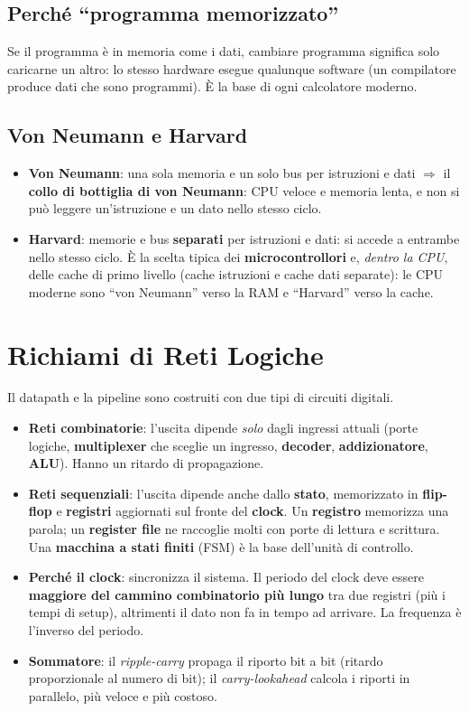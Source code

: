 \subsection{Perché ``programma memorizzato''}
Se il programma è in memoria come i dati, cambiare programma significa solo caricarne un altro: lo stesso hardware esegue qualunque software (un compilatore produce dati che sono programmi). È la base di ogni calcolatore moderno.

\subsection{Von Neumann e Harvard}
\begin{itemize}
    \item \textbf{Von Neumann}: una sola memoria e un solo bus per istruzioni e dati $\Rightarrow$ il \textbf{collo di bottiglia di von Neumann}: CPU veloce e memoria lenta, e non si può leggere un'istruzione e un dato nello stesso ciclo.
    \item \textbf{Harvard}: memorie e bus \textbf{separati} per istruzioni e dati: si accede a entrambe nello stesso ciclo. È la scelta tipica dei \textbf{microcontrollori} e, \emph{dentro la CPU}, delle cache di primo livello (cache istruzioni e cache dati separate): le CPU moderne sono ``von Neumann'' verso la RAM e ``Harvard'' verso la cache.
\end{itemize}

\section{Richiami di Reti Logiche}
Il datapath e la pipeline sono costruiti con due tipi di circuiti digitali.
\begin{itemize}
    \item \textbf{Reti combinatorie}: l'uscita dipende \emph{solo} dagli ingressi attuali (porte logiche, \textbf{multiplexer} che sceglie un ingresso, \textbf{decoder}, \textbf{addizionatore}, \textbf{ALU}). Hanno un ritardo di propagazione.
    \item \textbf{Reti sequenziali}: l'uscita dipende anche dallo \textbf{stato}, memorizzato in \textbf{flip-flop} e \textbf{registri} aggiornati sul fronte del \textbf{clock}. Un \textbf{registro} memorizza una parola; un \textbf{register file} ne raccoglie molti con porte di lettura e scrittura. Una \textbf{macchina a stati finiti} (FSM) è la base dell'unità di controllo.
    \item \textbf{Perché il clock}: sincronizza il sistema. Il periodo del clock deve essere \textbf{maggiore del cammino combinatorio più lungo} tra due registri (più i tempi di setup), altrimenti il dato non fa in tempo ad arrivare. La frequenza è l'inverso del periodo.
    \item \textbf{Sommatore}: il \emph{ripple-carry} propaga il riporto bit a bit (ritardo proporzionale al numero di bit); il \emph{carry-lookahead} calcola i riporti in parallelo, più veloce e più costoso.
\end{itemize}

